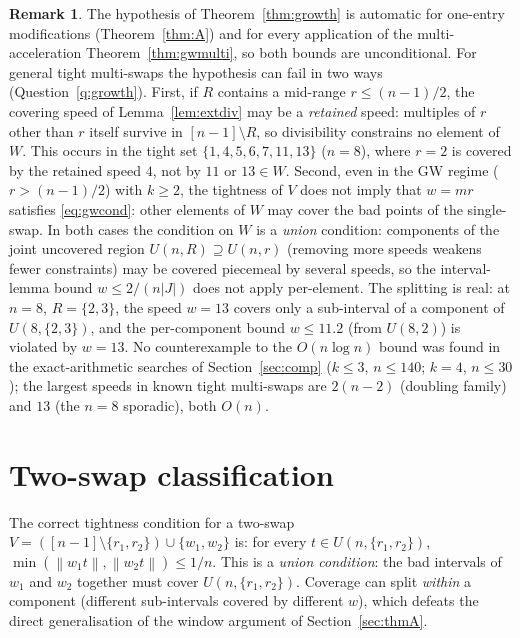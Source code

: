 \documentclass[11pt]{article}
\theoremstyle{definition}
\newtheorem{remark}[theorem]{Remark}
\newcommand{\norm}[1]{\left\lVert #1 \right\rVert}
\begin{document}
\begin{remark}
The hypothesis of Theorem~\ref{thm:growth} is automatic for one-entry
modifications (Theorem~\ref{thm:A}) and for every application of the
multi-acceleration Theorem~\ref{thm:gwmulti}, so both bounds are
unconditional. For
general tight multi-swaps the hypothesis can fail in two ways
(Question~\ref{q:growth}). First, if $R$ contains a mid-range
$r\le(n-1)/2$, the covering speed of Lemma~\ref{lem:extdiv} may be a
\emph{retained} speed: multiples of $r$ other than $r$ itself survive
in $[n-1]\setminus R$, so divisibility constrains no element of $W$.
This occurs in the tight set $\{1,4,5,6,7,11,13\}$ ($n=8$), where
$r=2$ is covered by the retained speed $4$, not by $11$ or $13\in W$.
Second, even in the GW regime ($r>(n-1)/2$) with $k\ge2$, the
tightness of $V$ does not imply that $w=mr$ satisfies
\eqref{eq:gwcond}: other elements of $W$ may cover the bad points of
the single-swap. In both cases the condition on $W$ is a \emph{union}
condition: components of the joint uncovered region
$U(n,R)\supseteq U(n,r)$ (removing more speeds weakens fewer
constraints) may be covered piecemeal by several speeds, so the
interval-lemma bound $w\le2/(n|J|)$ does not apply per-element. The
splitting is real: at $n=8$, $R=\{2,3\}$, the speed $w=13$ covers only
a sub-interval of a component of $U(8,\{2,3\})$, and the per-component
bound $w\le11.2$ (from $U(8,2)$) is violated by $w=13$. No
counterexample to the $O(n\log n)$ bound was found in the
exact-arithmetic searches of Section~\ref{sec:comp} ($k\le3$,
$n\le140$; $k=4$, $n\le30$); the largest speeds in known tight
multi-swaps are $2(n-2)$ (doubling family) and $13$ (the $n=8$ sporadic),
both $O(n)$.
\end{remark}

\section{Two-swap classification}\label{sec:twoswap}

The correct tightness condition for a two-swap
$V=([n-1]\setminus\{r_1,r_2\})\cup\{w_1,w_2\}$ is: for every
$t\in U(n,\{r_1,r_2\})$, $\min(\norm{w_1t},\norm{w_2t})\le1/n$. This is a
\emph{union condition}: the bad intervals of $w_1$ and $w_2$ together must
cover $U(n,\{r_1,r_2\})$. Coverage can split \emph{within} a component
(different sub-intervals covered by different $w$), which defeats the
direct generalisation of the window argument of Section~\ref{sec:thmA}.
\end{document}
